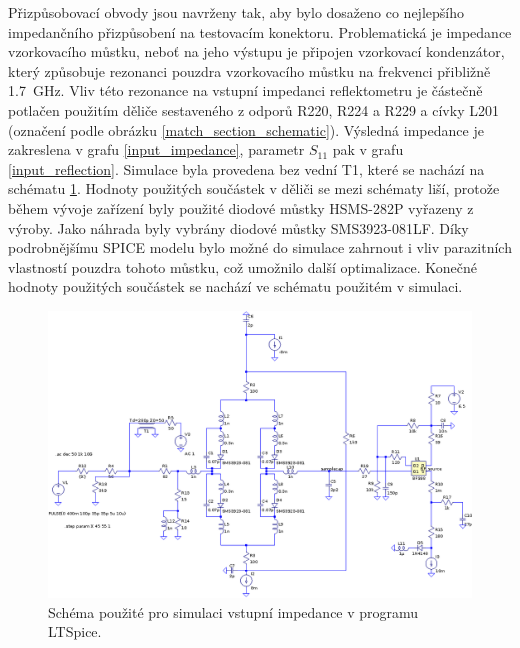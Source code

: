 Přizpůsobovací obvody jsou navrženy tak, aby bylo dosaženo co nejlepšího impedančního přizpůsobení na testovacím konektoru. Problematická je impedance vzorkovacího můstku, neboť na jeho výstupu je připojen vzorkovací kondenzátor, který způsobuje rezonanci pouzdra vzorkovacího můstku na frekvenci přibližně \SI{1.7}{\giga\hertz}. Vliv této rezonance na vstupní impedanci reflektometru je částečně potlačen použitím děliče sestaveného z odporů R220, R224 a R229 a cívky L201 (označení podle obrázku \ref{match_section_schematic}). Výsledná impedance je zakreslena v grafu \ref{input_impedance}, parametr $S_{11}$ pak v grafu \ref{input_reflection}. Simulace byla provedena bez vední T1, které se nachází na schématu \ref{ltspice_schematic}. Hodnoty použitých součástek v děliči se mezi schématy liší, protože během vývoje zařízení byly použité diodové můstky HSMS-282P vyřazeny z výroby. Jako náhrada byly vybrány diodové můstky SMS3923-081LF. Díky podrobnějšímu SPICE modelu bylo možné do simulace zahrnout i vliv parazitních vlastností pouzdra tohoto můstku, což umožnilo další optimalizace. Konečné hodnoty použitých součástek se nachází ve schématu použitém v simulaci.

\begin{figure}[htbp]
\includegraphics[width=\textwidth,keepaspectratio]{images/ltspice_schematic.eps}\caption{Schéma použité pro simulaci vstupní impedance v programu LTSpice.}\label{ltspice_schematic}
\end{figure}

